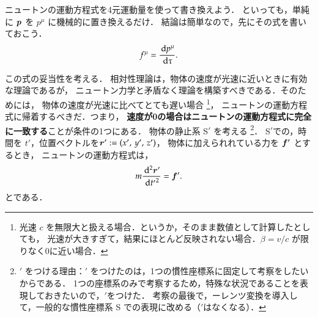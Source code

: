     ニュートンの運動方程式を4元運動量を使って書き換えよう．
    といっても，単純に $\boldsymbol{p}$ を $p^{\mu}$ に機械的に置き換えるだけ．
    結論は簡単なので，先にその式を書いておこう．
    \begin{align}
        f^{\mu} = \frac{\,\mathrm{d} p^{\mu}}{\,\mathrm{d} \tau}.
    \end{align}

    この式の妥当性を考える．
    相対性理論は，物体の速度が光速に近いときに有効な理論であるが，
    ニュートン力学と矛盾なく理論を構築すべきである．そのためには，
    物体の速度が光速に比べてとても遅い場合
        \footnote{
            光速 $c$ を無限大と扱える場合．というか，そのまま数値として計算したとしても，
            光速が大きすぎて，結果にほとんど反映されない場合．$\beta=v/c$ が限りなく0に近い場合．
        }，
    ニュートンの運動方程式に帰着するべきだ．つまり，
    \textbf{速度が0の場合はニュートンの運動方程式に完全に一致する}ことが条件の1つにある．
    物体の静止系 S$'$ を考える
        \footnote{
            $'$ をつける理由：$'$ をつけたのは，1つの慣性座標系に固定して考察をしたいからである．
            1つの座標系のみで考察するため，特殊な状況であることを表現しておきたいので，$'$をつけた．
            考察の最後で，ーレンツ変換を導入して，一般的な慣性座標系 S での表現に改める（$'$はなくなる）．
        }．
    S$'$での，時間を $t'$，位置ベクトルを$\boldsymbol{r}' := (x',\, y',\, z')$，
    物体に加えられれている力を $\boldsymbol{f}'$ とするとき，
    ニュートンの運動方程式は，
        \begin{equation}\label{eq:newton_eq_base}
            m\frac{\df^{2} \br'}{\df {t'}^{2}} = \bldf'.
        \end{equation}
    とである．

